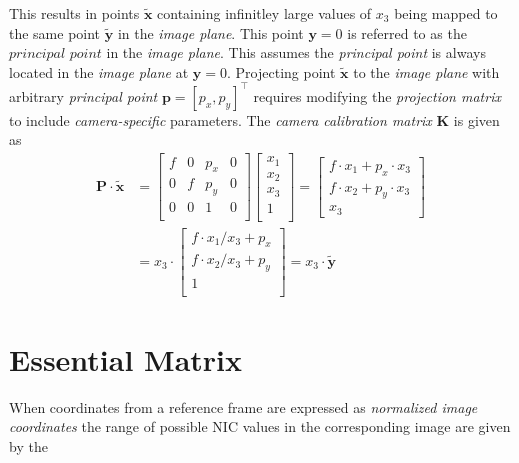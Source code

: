 \documentclass[12pt]{report}
\begin{document}
This results in points $\mathbf{\tilde{x}}$ containing infinitley large values of $x_3$ being mapped to the same point $\mathbf{\tilde{y}}$ in the \textit{image plane}. This point $\mathbf{y}=0$ is referred to as the $\textit{principal point}$ in the \textit{image plane}. This assumes the \textit{principal point} is always located in the \textit{image plane} at $\mathbf{y}=0$. Projecting point $\mathbf{\tilde{x}}$ to the \textit{image plane} with arbitrary \textit{principal point} $\mathbf{p}=[p_x,p_y]^\intercal$ requires modifying the \textit{projection matrix} to include \textit{camera-specific} parameters. The \textit{camera calibration matrix} $\mathbf{K}$ is given as
\begin{equation*}
\begin{split}
\mathbf{P}\cdot\mathbf{\tilde{x}}&=
\begin{bmatrix}
f & 0 & p_x & 0\\
0 & f & p_y & 0\\
0 & 0 & 1 & 0\\
\end{bmatrix}\begin{bmatrix}x_1\\x_2\\x_3\\1\\\end{bmatrix}
=\begin{bmatrix}
f\cdot x_1+p_x\cdot x_3\\
f\cdot x_2+p_y\cdot x_3\\
x_3
\end{bmatrix}\\
&=
x_3\cdot\begin{bmatrix}
f\cdot x_1/x_3+p_x\\
f\cdot x_2/x_3+p_y\\
1\\
\end{bmatrix}
=x_3\cdot\mathbf{\tilde{y}}
\end{split}
\end{equation*} 


\section{Essential Matrix}

\par When coordinates from a reference frame are expressed as \textit{normalized image coordinates} the range of possible NIC values in the corresponding image are given by the 
\end{document}
